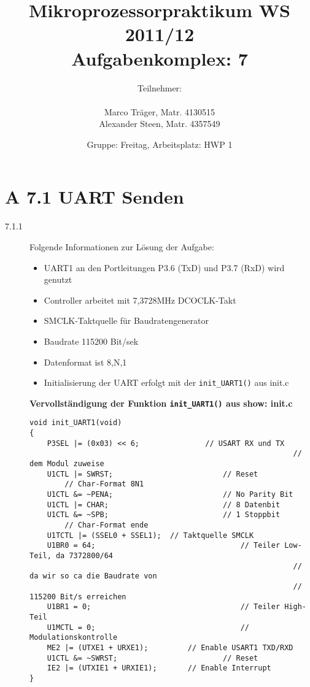 \documentclass[11pt,a4paper,ngerman]{article}
\author{Teilnehmer:\\ \\Marco Träger, Matr. 4130515\\Alexander Steen, Matr. 4357549}
\date{Gruppe: Freitag, Arbeitsplatz: HWP 1}
\title{Mikroprozessorpraktikum WS 2011/12\\ Aufgabenkomplex: 7}
\begin{document}

\maketitle
\thispagestyle{fancy}
\newpage
\section*{A 7.1 UART Senden}

\begin{description}
\item[7.1.1] Folgende Informationen zur Lösung der Aufgabe:
	\begin{itemize}
		\item UART1 an den Portleitungen P3.6 (TxD) und P3.7 (RxD) wird genutzt
		\item Controller arbeitet mit 7,3728MHz DCOCLK-Takt
		\item SMCLK-Taktquelle für Baudratengenerator
		\item Baudrate 115200 Bit/sek 
		\item Datenformat ist 8,N,1
		\item Initialisierung der UART erfolgt mit der \lstinline|init_UART1()| aus init.c
	\end{itemize}
	
	\textbf{Vervollständigung der Funktion \lstinline|init_UART1()| aus show: init.c}
	
\begin{lstlisting}
void init_UART1(void)
{
	P3SEL |= (0x03) << 6;				// USART RX und TX 
															// dem Modul zuweise 
	U1CTL |= SWRST; 						// Reset
		// Char-Format 8N1
	U1CTL &= ~PENA; 						// No Parity Bit
	U1CTL |= CHAR; 							// 8 Datenbit
	U1CTL &= ~SPB; 							// 1 Stoppbit
		// Char-Format ende
	U1TCTL |= (SSEL0 + SSEL1);	// Taktquelle SMCLK
	U1BR0 = 64;  								// Teiler Low-Teil, da 7372800/64 
															// da wir so ca die Baudrate von 
															// 115200 Bit/s erreichen
	U1BR1 = 0;									// Teiler High-Teil 
	U1MCTL = 0; 								// Modulationskontrolle
	ME2 |= (UTXE1 + URXE1);			// Enable USART1 TXD/RXD
	U1CTL &= ~SWRST;	 					// Reset
	IE2 |= (UTXIE1 + URXIE1);		// Enable Interrupt
}

\end{lstlisting}


\end{description}
\end{document}
